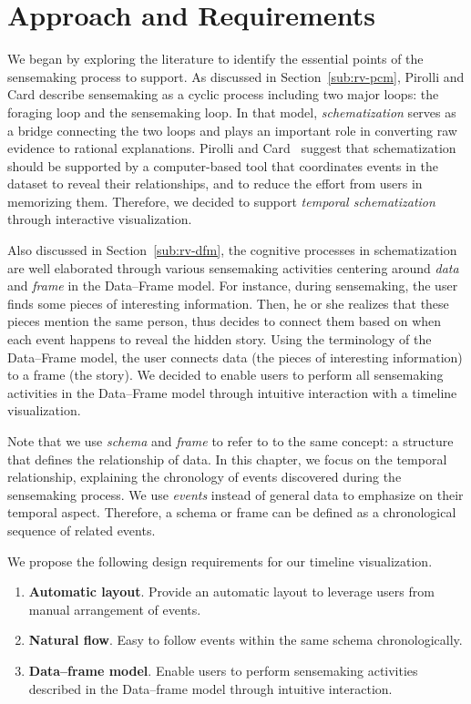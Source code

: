 \section{Approach and Requirements}

We began by exploring the literature to identify the essential points of the sensemaking process to support. As discussed in Section~\ref{sub:rv-pcm}, Pirolli and Card describe sensemaking as a cyclic process including two major loops: the foraging loop and the sensemaking loop. In that model, \emph{schematization} serves as a bridge connecting the two loops and plays an important role in converting raw evidence to rational explanations. Pirolli and Card~\cite{Pirolli2005} suggest that schematization should be supported by a computer-based tool that coordinates events in the dataset to reveal their relationships, and to reduce the effort from users in memorizing them. Therefore, we decided to support \emph{temporal schematization} through interactive visualization.

Also discussed in Section~\ref{sub:rv-dfm}, the cognitive processes in schematization are well elaborated through various sensemaking activities centering around \emph{data} and \emph{frame} in the Data--Frame model. For instance, during sensemaking, the user finds some pieces of interesting information. Then, he or she realizes that these pieces mention the same person, thus decides to connect them based on when each event happens to reveal the hidden story. Using the terminology of the Data--Frame model, the user connects data (the pieces of interesting information) to a frame (the story). We decided to enable users to perform all sensemaking activities in the Data--Frame model through intuitive interaction with a timeline visualization. 

Note that we use \emph{schema} and \emph{frame} to refer to to the same concept: a structure that defines the relationship of data. In this chapter, we focus on the temporal relationship, explaining the chronology of events discovered during the sensemaking process. We use \emph{events} instead of general data to emphasize on their temporal aspect. Therefore, a schema or frame can be defined as a chronological sequence of related events.

We propose the following design requirements for our timeline visualization.

\begin{enumerate}
	\item \textbf{Automatic layout}. Provide an automatic layout to leverage users from manual arrangement of events.
	\item \textbf{Natural flow}. Easy to follow events within the same schema chronologically.
	\item \textbf{Data--frame model}. Enable users to perform sensemaking activities described in the Data--frame model through intuitive interaction.
\end{enumerate}